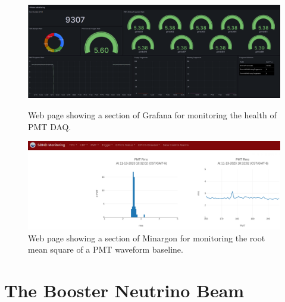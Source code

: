 \begin{figure}[ht!] 
\centering    
\includegraphics[width=1.0\textwidth]{Grafana}
\caption[Grafana Online Monitoring Web Page]{
Web page showing a section of Grafana for monitoring the health of PMT DAQ.
}
\label{fig:Grafana}
\vspace{0.5cm}
\centering    
\includegraphics[width=1.0\textwidth]{Minargon}
\caption[Minargon Online Monitoring Web Page]{
Web page showing a section of Minargon for monitoring the root mean square of a PMT waveform baseline.
}
\label{fig:Minargon}
\end{figure}

\section{The Booster Neutrino Beam}
\label{sec4BNB}

